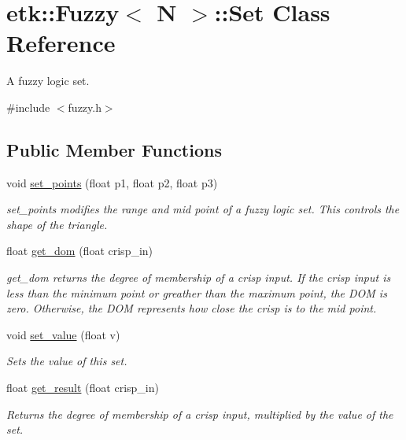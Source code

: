 \hypertarget{classetk_1_1_fuzzy_1_1_set}{\section{etk\-:\-:Fuzzy$<$ N $>$\-:\-:Set Class Reference}
\label{classetk_1_1_fuzzy_1_1_set}
}


A fuzzy logic set.  




{\ttfamily \#include $<$fuzzy.\-h$>$}

\subsection*{Public Member Functions}
\begin{DoxyCompactItemize}
\item 
void \hyperlink{classetk_1_1_fuzzy_1_1_set_af3d525a63382b697559aff3a3f70ea65}{set\-\_\-points} (float p1, float p2, float p3)
\begin{DoxyCompactList}\small\item\em set\-\_\-points modifies the range and mid point of a fuzzy logic set. This controls the shape of the triangle. \end{DoxyCompactList}\item 
float \hyperlink{classetk_1_1_fuzzy_1_1_set_a7dac2b7d03e467b8b22a806e82adec59}{get\-\_\-dom} (float crisp\-\_\-in)
\begin{DoxyCompactList}\small\item\em get\-\_\-dom returns the degree of membership of a crisp input. If the crisp input is less than the minimum point or greather than the maximum point, the D\-O\-M is zero. Otherwise, the D\-O\-M represents how close the crisp is to the mid point. \end{DoxyCompactList}\item 
void \hyperlink{classetk_1_1_fuzzy_1_1_set_aca2ae652a087e109f032e7e82db6f6b5}{set\-\_\-value} (float v)
\begin{DoxyCompactList}\small\item\em Sets the value of this set. \end{DoxyCompactList}\item 
float \hyperlink{classetk_1_1_fuzzy_1_1_set_ae2a4f2ace143666060977617d51c4f45}{get\-\_\-result} (float crisp\-\_\-in)
\begin{DoxyCompactList}\small\item\em Returns the degree of membership of a crisp input, multiplied by the value of the set. \end{DoxyCompactList}\item 

\end{DoxyCompactItemize}
